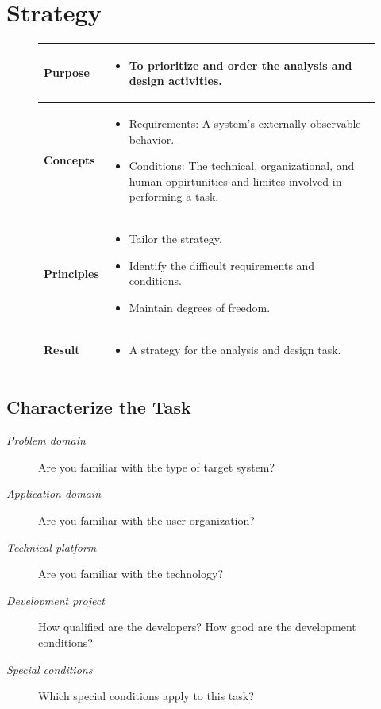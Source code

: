 \chapter{Strategy}
\begin{figure}[H]
    \begin{tabular}{|l|p{12cm}|}
        \hline
        \textbf{Purpose} & \begin{itemize}
            \item To prioritize and order the analysis and design activities.
        \end{itemize} \\\hline
        \textbf{Concepts} & \begin{itemize}
            \item Requirements: A system's externally observable behavior.
            \item Conditions: The technical, organizational, and human oppirtunities and limites involved in performing a task.
        \end{itemize} \\\hline
        \textbf{Principles} & \begin{itemize}
            \item Tailor the strategy.
            \item Identify the difficult requirements and conditions.
            \item Maintain degrees of freedom.
        \end{itemize} \\\hline
        \textbf{Result} & \begin{itemize}
            \item A strategy for the analysis and design task.
        \end{itemize} \\\hline
    \end{tabular}
\end{figure}

\section{Characterize the Task}
\begin{description}
    \item[\textit{Problem domain}] Are you familiar with the type of target system? 
    \item[\textit{Application domain}] Are you familiar with the user organization?  
    \item[\textit{Technical platform}] Are you familiar with the technology?  
    \item[\textit{Development project}] How qualified are the developers? How good are the development conditions?  
    \item[\textit{Special conditions}] Which special conditions apply to this task?  
\end{description}

